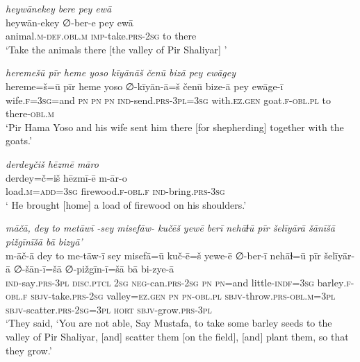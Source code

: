 \ea \label{ŽP.21}
\textit{heywānekey bere pey ewā} \\ 
\gll heywān-ekey ∅-ber-e pey ewā \\ 
 animal\textsc{.m}\textsc{-def}\textsc{.obl}\textsc{.m} \textsc{imp-}take\textsc{.prs}-\textsc{2sg} to there \\ 
\glt `Take the animals there [the valley of Pir Shaliyar] '
\z 
 
\ea \label{ŽP.22}
\textit{heremešū pīr heme yoso kīyānāš čenū bizā pey ewāgey} \\ 
\gll hereme=š=ū pīr heme yoso ∅-kīyān-ā=š čenū bize-ā pey ewāge-ī \\ 
 wife\textsc{.f}\textsc{=3sg}=and \textsc{pn} \textsc{pn} \textsc{pn} \textsc{ind-}send\textsc{.prs}\textsc{-3pl}\textsc{=3sg} with\textsc{.ez.gen} goat\textsc{.f}\textsc{-obl}\textsc{.pl} to there\textsc{-obl}\textsc{.m} \\ 
\glt `Pir Hama Yoso and his wife sent him there [for shepherding] together with the goats.'
\z 
 
\ea \label{ŽP.25}
\textit{derdeyčiš hēzmē māro} \\ 
\gll derdey=č=iš hēzmī-ē m-ār-o \\ 
 load\textsc{.m}\textsc{=add}\textsc{=3sg} firewood\textsc{.f}\textsc{-obl}\textsc{.f} \textsc{ind-}bring\textsc{.prs}\textsc{-3sg} \\ 
\glt ` He brought [home] a load of firewood on his shoulders.'
\z 
 
\ea \label{ŽP.27}
\textit{māčā, dey to metāwī -sey misefāw- kučēš yewē berī nehāɫū pīr šelīyārā šānīšā pižgīnīšā bā bizyā’} \\ 
\gll m-āč-ā dey to me-tāw-ī sey misefā=ū kuč-ē=š yewe-ē ∅-ber-ī nehāɫ=ū pīr šelīyār-ā ∅-šān-ī=šā ∅-pižgīn-ī=šā bā bi-zye-ā \\ 
 \textsc{ind-}say\textsc{.prs}\textsc{-3pl} \textsc{disc.ptcl} \textsc{2sg} \textsc{neg-}can\textsc{.prs}-\textsc{2sg} \textsc{pn} \textsc{pn}=and little\textsc{-indf}\textsc{=3sg} barley\textsc{.f}\textsc{-obl}\textsc{.f} \textsc{sbjv-}take\textsc{.prs}-\textsc{2sg} valley\textsc{\textsc{=ez.gen}} \textsc{pn} \textsc{pn}\textsc{-obl}\textsc{.pl} \textsc{sbjv-}throw\textsc{.prs}\textsc{-obl}\textsc{.m}\textsc{=3pl} \textsc{sbjv-}scatter\textsc{.prs}-\textsc{2sg}\textsc{=3pl} \textsc{hort} \textsc{sbjv-}grow\textsc{.prs}\textsc{-3pl} \\ 
\glt `They said, ‘You are not able, Say Mustafa, to take some barley seeds to the valley of Pir Shaliyar, [and] scatter them [on the field], [and] plant them, so that they grow.'
\z 
 
